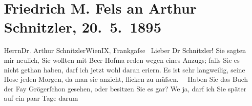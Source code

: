 

         
         \renewcommand{\erwaehntePersonen}{Personen: Richard Beer-Hofmann, Raoul Bourse, Friedrich Michael Fels, Fanny Gröger, Robert Hirschfeld, Gaspard Vallette}
         \renewcommand{\erwaehnteOrte}{Orte: Frankgasse 1, I., Innere Stadt, IX., Alsergrund, Ossiacher See, Wien, Währinger Gürtel}
         \renewcommand{\erwaehnteWerke}{Werke: Adhimukti, Sterben. Novelle}
               \section[Friedrich M. Fels an Arthur Schnitzler, 20. 5. 1895]{ Friedrich M. Fels an Arthur Schnitzler, 20. 5. 1895}\nopagebreak{}\rehead{ }\begin{ledgroupsized}[t]{13cm}\normalsize\beginnumbering \toendnotes[C]{\smallbreak\pagebreak[2]} 
\toendnotes[C]{\smallbreak}\pstart{}{\pb}Herrn\pend{}\pstart{}Dr. Arthur Schnitzler\pend{}\pstart{}Wien\pend{}\pstart{}IX, Frankgaſse \pend{}{\bigskip}\pstart
           \noindent{}{\pb}Lieber Dr Schnitzler!  Sie sagten mir neulich, Sie wollten mit Beer-Hofma{\geminationn} reden wegen eines Anzugs; falls Sie es nicht gethan haben, darf ich jetzt wohl
               daran eri{\geminationn}ern. Es ist sehr langweilig, seine Hose jeden
               Morgen, da man sie anzieht, flicken zu müſsen. – Haben Sie das Buch der Fa{\geminationn}y Grögerſchon gesehen, oder besitzen Sie es gar? We{\geminationn} ja, darf ich Sie später auf ein paar Tage darum

\end{ledgroupsized}
